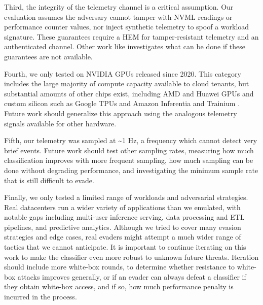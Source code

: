 Third, the integrity of the telemetry channel is a critical assumption. Our evaluation assumes the adversary cannot tamper with NVML readings or performance counter values, nor inject synthetic telemetry to spoof a workload signature. These guarantees require a HEM for tamper-resistant telemetry and an authenticated channel. Other work like \citet{monfared2026} investigates what can be done if these guarantees are not available.

Fourth, we only tested on NVIDIA GPUs released since 2020. This category includes the large majority of compute capacity available to cloud tenants, but substantial amounts of other chips exist, including AMD and Huawei GPUs and custom silicon such as Google TPUs and Amazon Inferentia and Trainium \citep{epoch2025}. Future work should generalize this approach using the analogous telemetry signals available for other hardware.

Fifth, our telemetry was sampled at \textasciitilde{}1 Hz, a frequency which cannot detect very brief events. Future work should test other sampling rates, measuring how much classification improves with more frequent sampling, how much sampling can be done without degrading performance, and investigating the minimum sample rate that is still difficult to evade.

Finally, we only tested a limited range of workloads and adversarial strategies. Real datacenters run a wider variety of applications than we emulated, with notable gaps including multi-user inference serving, data processing and ETL pipelines, and predictive analytics. Although we tried to cover many evasion strategies and edge cases, real evaders might attempt a much wider range of tactics that we cannot anticipate. It is important to continue iterating on this work to make the classifier even more robust to unknown future threats. Iteration should include more white-box rounds, to determine whether resistance to white-box attacks improves generally, or if an evader can always defeat a classifier if they obtain white-box access, and if so, how much performance penalty is incurred in the process.
